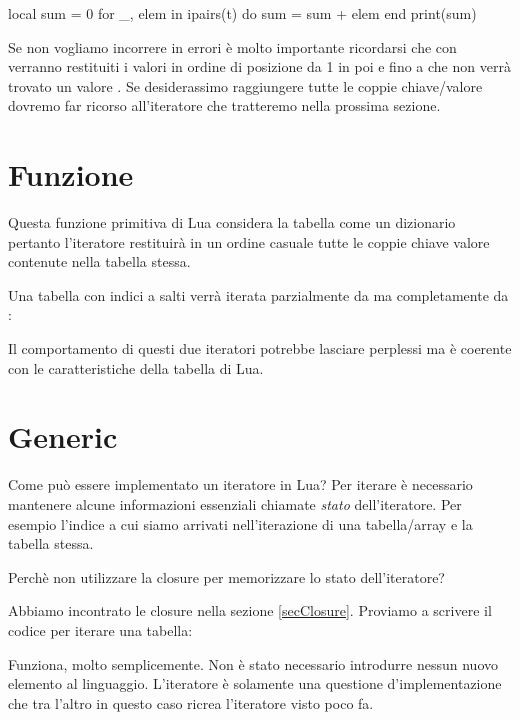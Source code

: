 local sum = 0
for _, elem in ipairs(t) do
    sum = sum + elem
end
print(sum)
\endlines
{}

Se non vogliamo incorrere in errori è molto importante ricordarsi che con
 verranno restituiti i valori in ordine di posizione da 1 in poi e
fino a che non verrà trovato un valore . Se desiderassimo raggiungere
tutte le coppie chiave/valore dovremo far ricorso all'iteratore 
che tratteremo nella prossima sezione.


\section{Funzione }
\label{secFondPairsIterator}

Questa funzione primitiva di Lua considera la tabella come un dizionario
pertanto l'iteratore restituirà in un ordine casuale tutte le coppie chiave
valore contenute nella tabella stessa.

Una tabella con indici a salti verrà iterata parzialmente da  ma
completamente da :

Il comportamento di questi due iteratori potrebbe lasciare perplessi ma è
coerente con le caratteristiche della tabella di Lua.


\section{Generic }

Come può essere implementato un iteratore in Lua? Per iterare è necessario
mantenere alcune informazioni essenziali chiamate \emph{stato} dell'iteratore.
Per esempio l'indice a cui siamo arrivati nell'iterazione di una tabella/array
e la tabella stessa.

Perchè non utilizzare la closure per memorizzare lo stato dell'iteratore?

Abbiamo incontrato le closure nella sezione \ref{secClosure}. Proviamo a
scrivere il codice per iterare una tabella:

Funziona, molto semplicemente. Non è stato necessario introdurre nessun nuovo
elemento al linguaggio. L'iteratore è solamente una questione d'implementazione
che tra l'altro in questo caso ricrea l'iteratore  visto poco fa.

